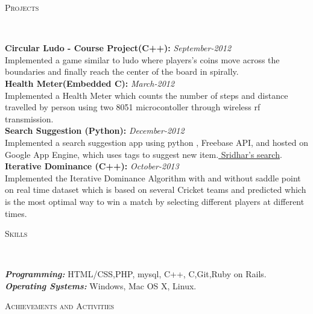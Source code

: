\documentclass[9pt]{article}
\newenvironment{changemargin}[2]{%
  \begin{list}{}{%
    \setlength{\topsep}{0pt}%
    \setlength{\leftmargin}{#1}%
    \setlength{\rightmargin}{#2}%
    \setlength{\listparindent}{\parindent}%
    \setlength{\itemindent}{\parindent}%
    \setlength{\parsep}{\parskip}%
  }%
  \item[]}{\end{list}
}
\newcommand{\lineover}{
	\begin{changemargin}{-0.05in}{-0.05in}
		\vspace*{-8pt}
		\hrulefill \\
		\vspace*{-2pt}
	\end{changemargin}
}
\newcommand{\header}[1]{
	\begin{changemargin}{-0.5in}{-0.5in}
		\scshape{#1}\\
  	\lineover
	\end{changemargin}
}
\newenvironment{body} {
	\vspace*{-16pt}
	\begin{changemargin}{-0.25in}{-0.5in}
  }	
	{\end{changemargin}
}
\begin{document}
\header{Projects}

\begin{body}
	\vspace{14pt}
	\textbf{Circular Ludo - Course Project(C++):} \hfill \emph{September-2012} \\
	Implemented a game similar to ludo where players's coins move across the boundaries and finally reach the center of the board in spirally.\\
	\smallskip
	\textbf{Health Meter(Embedded C):} \hfill \emph{March-2012} \\
	Implemented a Health Meter which counts the number of steps and distance travelled by person using two 8051 microcontoller through wireless rf transmission.\\
	\smallskip
	\textbf{Search Suggestion (Python):} \hfill \emph{December-2012} \\
	Implemented a search suggestion app using python , Freebase API, and hosted on Google App Engine, which uses tags to suggest new item.\underline{ \href{http://www.sridharreddy0007m.appspot.com}{Sridhar's search}}. \\
	\textbf{Iterative Dominance (C++):} \hfill \emph{October-2013} \\
	Implemented the Iterative Dominance Algorithm with and without saddle point on real time dataset which is  based on several Cricket teams and predicted which is the most optimal way to win a match by selecting different players at different times.\\
	

	\smallskip
	
\end{body}


\header{Skills}

\begin{body}
	\vspace{14pt}
	\emph{\textbf{Programming:}}{}  HTML/CSS,PHP, mysql, C++, C,Git,Ruby on Rails.\\
	\medskip
	\emph{\textbf{Operating Systems:}}{} Windows, Mac OS X, Linux.\\
\end{body}



\header{Achievements and Activities }
\end{document}
